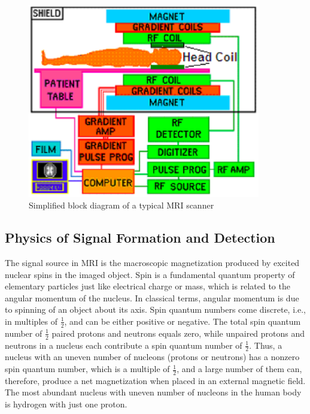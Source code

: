 \begin{figure}[htb]
  \begin{minipage}[b]{4in}
    \centering
    \centerline{\mbox{\includegraphics[width=4in]{background/images/MRI_hardware.eps}}}
  \end{minipage}
\caption{Simplified block diagram of a typical MRI scanner} \label{fig:scanner_block}
\end{figure}

\subsection{Physics of Signal Formation and Detection}

The signal source in MRI is the macroscopic magnetization produced by excited nuclear spins in the 
imaged object. Spin is a fundamental quantum property of elementary particles just like electrical 
charge or mass, which is related to the angular momentum of the nucleus. In classical terms, angular 
momentum is due to spinning of an object about its axis. Spin quantum numbers come discrete, i.e.,  in 
multiples of $\frac{1}{2}$, and can be either positive or negative. The total spin quantum number of 
$\frac{1}{2}$ paired protons
and neutrons equals zero, while unpaired protons and neutrons in a nucleus each contribute a spin 
quantum number of $\frac{1}{2}$. Thus, a nucleus with an uneven number of nucleons (protons or neutrons) 
has a nonzero spin quantum number, which is a multiple of $\frac{1}{2}$, 
and a large number of them can, therefore, 
produce a net magnetization when placed in an external magnetic field. The most abundant nucleus with 
uneven number of nucleons in the human body is hydrogen with just one proton.

